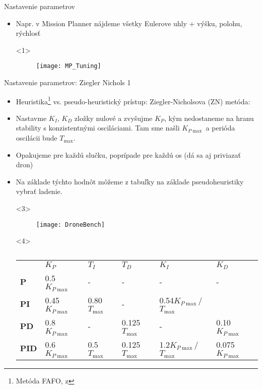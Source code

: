 \begin{frame}[t]{Nastavenie parametrov}
\begin{itemize}
  \item<1-> Napr. v Mission Planner nájdeme všetky Eulerove uhly + výšku, polohu, rýchlosť

  \begin{onlyenv}<1>
  \begin{figure}
\centering
  \texttt{[image: MP\_Tuning]}\\
\end{figure}
\end{onlyenv}
\end{itemize}


\end{frame}

\begin{frame}[t]{Nastavenie parametrov: Ziegler Nichols 1}
\begin{itemize}
  \item<1-> Heuristika\footnote{Metóda FAFO, z } vs.  pseudo-heuristický prístup: Ziegler-Nicholsova (ZN) metóda: \citep{Ziegler1942}
  \item<2-> Nastavme $K_I$, $K_D$ zložky nulové a zvyšujme $K_P$, kým nedostaneme na hranu stability s konzistentnými osciláciami. Tam sme našli $K_{P\max}$ a perióda oscilácii bude $T_{\max}$.
  \item<3-> Opakujeme pre každú slučku, poprípade pre každú os (dá sa aj priviazať dron)
  \item<4-> Na základe týchto hodnôt môžeme z tabuľky na základe pseudoheuristiky vybrať ladenie.

  \begin{onlyenv}<3>
  \begin{figure}
\centering
  \texttt{[image: DroneBench]}\\
\end{figure}
\end{onlyenv}

  \begin{onlyenv}<4>
\begin{table}[]
\caption{}
\label{tab:my-table}
\footnotesize
\begin{tabular}{llllll}
 & $K_P$     & $T_I$     & $T_D$      & $K_I$        & $K_D$     \\
\textbf{P }  & 0.5$K_{P\max}$  & -       &  -       &    -       &  -       \\
\textbf{PI } & 0.45$K_{P\max}$ & 0.80$T_{\max}$ &-         & 0.54$K_{P\max}$/$T_{\max}$ &         \\
\textbf{PD}  & 0.8$K_{P\max}$  &  -      & 0.125$T_{\max}$ &  -         & 0.10$K_{P\max}$  \\
\textbf{PID} & 0.6$K_{P\max}$  & 0.5$T_{\max}$  & 0.125$T_{\max}$ & 1.2$K_{P\max}$/$T_{\max}$  & 0.075$K_{P\max}$
\end{tabular}
\end{table}
\end{onlyenv}


\end{itemize}


\end{frame}

